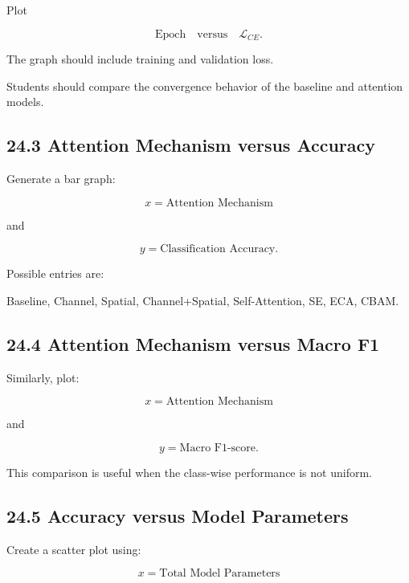 \documentclass[10pt]{article}
\begin{document}
Plot

\[
\text{Epoch}
\quad\text{versus}\quad
\mathcal{L}_{CE}.
\]

The graph should include training and validation loss.

Students should compare the convergence behavior of the baseline and
attention models.

\subsection*{24.3 Attention Mechanism versus Accuracy}

Generate a bar graph:

\[
x=
\text{Attention Mechanism}
\]

and

\[
y=
\text{Classification Accuracy}.
\]

Possible entries are:

\begin{center}

Baseline,
Channel,
Spatial,
Channel+Spatial,
Self-Attention,
SE,
ECA,
CBAM.

\end{center}

\subsection*{24.4 Attention Mechanism versus Macro F1}

Similarly, plot:

\[
x=
\text{Attention Mechanism}
\]

and

\[
y=
\text{Macro F1-score}.
\]

This comparison is useful when the class-wise performance is not uniform.

\subsection*{24.5 Accuracy versus Model Parameters}

Create a scatter plot using:

\[
x=
\text{Total Model Parameters}
\]
\end{document}
